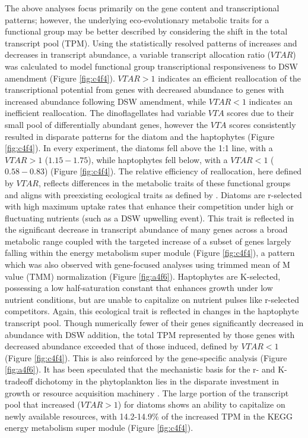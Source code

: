 The above analyses focus primarily on the gene content and transcriptional patterns; however, the underlying eco-evolutionary metabolic traits for a functional group may be better described by considering the shift in the total transcript pool (TPM). Using the statistically resolved patterns of increases and decreases in transcript abundance, a variable transcript allocation ratio ($VTAR$) was calculated to model functional group transcriptional responsiveness to DSW amendment (Figure \ref{fig:c4f4}). $VTAR > 1$ indicates an efficient reallocation of the transcriptional potential from genes with decreased abundance to genes with increased abundance following DSW amendment, while $VTAR < 1$ indicates an inefficient reallocation. The dinoflagellates had variable $VTA$ scores due to their small pool of differentially abundant genes, however the $VTA$ scores consistently resulted in disparate patterns for the diatom and the haptophytes (Figure \ref{fig:c4f4}). In every experiment, the diatoms fell above the 1:1 line, with a $VTAR > 1$ ($1.15 - 1.75$), while haptophytes fell below, with a $VTAR < 1$ ($0.58 - 0.83$) (Figure \ref{fig:c4f4}). The relative efficiency of reallocation, here defined by $VTAR$, reflects differences in the metabolic traits of these functional groups and aligns with preexisting ecological traits as defined by \citep{Margalef1978}. Diatoms are r-selected with high maximum uptake rates that enhance their competition under high or fluctuating nutrients (such as a DSW upwelling event). This trait is reflected in the significant decrease in transcript abundance of many genes across a broad metabolic range coupled with the targeted increase of a subset of genes largely falling within the energy metabolism super module (Figure \ref{fig:c4f4}), a pattern which was also observed with gene-focused analyses using trimmed mean of M value (TMM) normalization \citep{Marchetti2012a, Robinson2010} (Figure \ref{fig:a4f6}). Haptophytes are K-selected, possessing a low half-saturation constant that enhances growth under low nutrient conditions, but are unable to capitalize on nutrient pulses like r-selected competitors. Again, this ecological trait is reflected in changes in the haptophyte transcript pool. Though numerically fewer of their genes significantly decreased in abundance with DSW addition, the total TPM represented by those genes with decreased abundance exceeded that of those induced, defined by $VTAR <1$ (Figure \ref{fig:c4f4}). This is also reinforced by the gene-specific analysis (Figure \ref{fig:a4f6}). It has been speculated that the mechanistic basis for the r- and K- tradeoff dichotomy in the phytoplankton lies in the disparate investment in growth or resource acquisition machinery \citep{Litchman2008}. The large portion of the transcript pool that increased ($VTAR > 1$) for diatoms shows an ability to capitalize on newly available resources, with 14.2-14.9\% of the increased TPM in the KEGG energy metabolism super module (Figure \ref{fig:c4f4}). 
